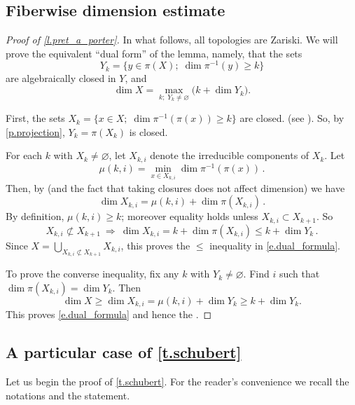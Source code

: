 \documentclass[10pt, a4paper]{amsart}
\theoremstyle{plain}
\theoremstyle{definition}
\theoremstyle{remark}
\theoremstyle{note}
\numberwithin{equation}{section}
\begin{document}
\subsection{Fiberwise dimension estimate}

\begin{proof}[Proof of \cref{l.pret_a_porter}]
In what follows, all topologies are Zariski.
We will prove the equivalent ``dual form'' of the lemma, namely, that
the sets 
$$
Y_k = \big\{ y \in \pi(X) ; \; \dim \pi^{-1}(y) \ge k \big\}
$$
are algebraically closed in $Y$,
and 
\begin{equation}\label{e.dual_formula}
\dim X = \max_{k ; \;  Y_k \neq {\varnothing}}
\big( k + \dim Y_k \big).
\end{equation}

First, the sets $X_k = \{x \in X ; \; \dim \pi^{-1}(\pi(x)) \ge k\}$ are closed.
(see \cite[Thrm.~11.12]{Harris}).
So, by \cref{p.projection}, $Y_k = \pi(X_k)$ is closed.

For each $k$ with $X_k \neq {\varnothing}$, 
let $X_{k,i}$ denote the irreducible components of $X_k$.
Let 
$$
\mu(k,i) = \min_{x \in X_{k,i}} \dim \pi^{-1}(\pi(x)) \, .
$$
Then, by \cite[Thrm.~11.12]{Harris} (and the fact that 
taking closures does not affect dimension) 
we have 
$$
\dim X_{k,i} = \mu(k,i) + \dim \pi(X_{k,i}) \, .
$$
By definition, $\mu(k,i) \ge k$;
moreover equality holds unless $X_{k,i} \subset X_{k+1}$.
So 
$$
X_{k,i} \not \subset X_{k+1} \ \Rightarrow \ 
\dim X_{k,i} 
=  k + \dim \pi(X_{k,i})  
\le k+ \dim Y_k \, .
$$
Since $X = \bigcup_{X_{k,i} \not \subset X_{k+1}} X_{k,i}$,
this proves the $\le$ inequality in \eqref{e.dual_formula}.

To prove the converse inequality, fix any $k$ with $Y_k \neq {\varnothing}$.
Find $i$ such that $\dim \pi(X_{k,i}) = \dim Y_k$.
Then
$$
\dim X \ge \dim X_{k,i} =  \mu(k,i) + \dim Y_k \ge k + \dim Y_k.
$$
This proves \eqref{e.dual_formula} and hence the .
\end{proof}

\subsection{A particular case of \cref{t.schubert}}\label{ss.particular}

Let us begin the proof of \cref{t.schubert}.
For the reader's convenience we recall the notations and the statement.
\end{document}
